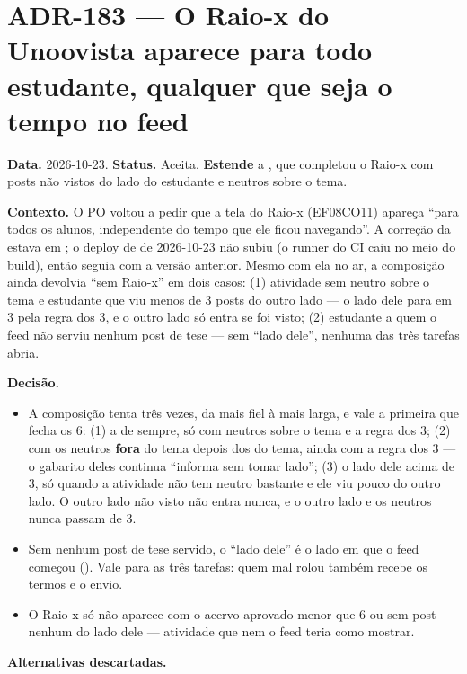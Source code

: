 \section{ADR-183 --- O Raio-x do Unoovista aparece para todo estudante, qualquer que seja o tempo no feed}
\label{adr:exp08ef1b-raio-x-para-todos}

\textbf{Data.} 2026-10-23. \textbf{Status.} Aceita. \textbf{Estende} a
, que completou o Raio-x com posts não vistos do lado do
estudante e neutros sobre o tema.

\textbf{Contexto.} O PO voltou a pedir que a tela do Raio-x (EF08CO11)
apareça \enquote{para todos os alunos, independente do tempo que ele ficou
navegando}. A correção da  estava em ; o deploy de
 de 2026-10-23 não subiu (o runner do CI caiu no meio do build), então
 seguia com a versão anterior. Mesmo com ela no ar, a composição ainda
devolvia \enquote{sem Raio-x} em dois casos: (1) atividade sem neutro sobre o
tema e estudante que viu menos de 3 posts do outro lado --- o lado dele para em
3 pela regra dos 3, e o outro lado só entra se foi visto; (2) estudante a quem
o feed não serviu nenhum post de tese --- sem \enquote{lado dele}, nenhuma das
três tarefas abria.

\textbf{Decisão.}

\begin{itemize}
  \item A composição tenta três vezes, da mais fiel à mais larga, e vale a
    primeira que fecha os 6: (1) a de sempre, só com neutros sobre o tema e a
    regra dos 3; (2) com os neutros \textbf{fora} do tema depois dos do tema,
    ainda com a regra dos 3 --- o gabarito deles continua \enquote{informa sem
    tomar lado}; (3) o lado dele acima de 3, só quando a atividade não tem
    neutro bastante e ele viu pouco do outro lado. O outro lado não visto não
    entra nunca, e o outro lado e os neutros nunca passam de 3.
  \item Sem nenhum post de tese servido, o \enquote{lado dele} é o lado em
    que o feed começou (). Vale para as três tarefas:
    quem mal rolou também recebe os termos e o envio.
  \item O Raio-x só não aparece com o acervo aprovado menor que 6 ou sem post
    nenhum do lado dele --- atividade que nem o feed teria como mostrar.
\end{itemize}

\textbf{Alternativas descartadas.}

